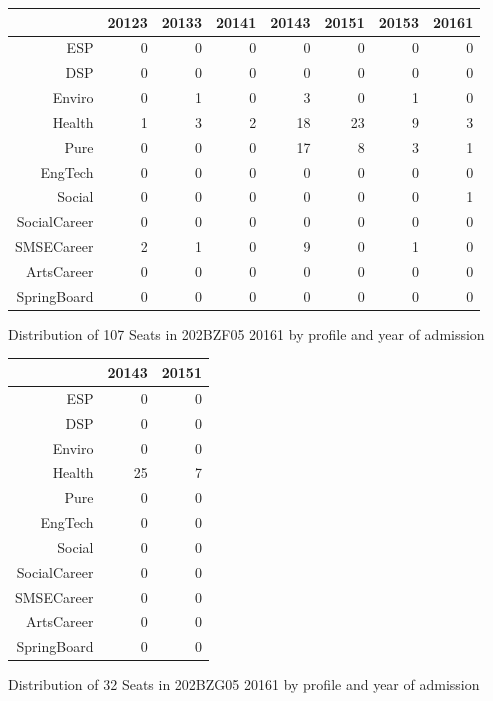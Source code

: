\documentclass{article}\usepackage[]{graphicx}\usepackage[]{color}
\begin{document}
\begin{figure}[H]
\centering
\begin{tabular}{rrrrrrrr}
  \hline
 & 20123 & 20133 & 20141 & 20143 & 20151 & 20153 & 20161 \\ 
  \hline
ESP &   0 &   0 &   0 &   0 &   0 &   0 &   0 \\ 
  DSP &   0 &   0 &   0 &   0 &   0 &   0 &   0 \\ 
  Enviro &   0 &   1 &   0 &   3 &   0 &   1 &   0 \\ 
  Health &   1 &   3 &   2 &  18 &  23 &   9 &   3 \\ 
  Pure &   0 &   0 &   0 &  17 &   8 &   3 &   1 \\ 
  EngTech &   0 &   0 &   0 &   0 &   0 &   0 &   0 \\ 
  Social &   0 &   0 &   0 &   0 &   0 &   0 &   1 \\ 
  SocialCareer &   0 &   0 &   0 &   0 &   0 &   0 &   0 \\ 
  SMSECareer &   2 &   1 &   0 &   9 &   0 &   1 &   0 \\ 
  ArtsCareer &   0 &   0 &   0 &   0 &   0 &   0 &   0 \\ 
  SpringBoard &   0 &   0 &   0 &   0 &   0 &   0 &   0 \\ 
   \hline
\end{tabular}
\caption{Distribution of 107 Seats in 202BZF05 20161 by profile and year of admission} 
\end{figure}
\begin{figure}[H]
\centering
\begin{tabular}{rrr}
  \hline
 & 20143 & 20151 \\ 
  \hline
ESP &   0 &   0 \\ 
  DSP &   0 &   0 \\ 
  Enviro &   0 &   0 \\ 
  Health &  25 &   7 \\ 
  Pure &   0 &   0 \\ 
  EngTech &   0 &   0 \\ 
  Social &   0 &   0 \\ 
  SocialCareer &   0 &   0 \\ 
  SMSECareer &   0 &   0 \\ 
  ArtsCareer &   0 &   0 \\ 
  SpringBoard &   0 &   0 \\ 
   \hline
\end{tabular}
\caption{Distribution of 32 Seats in 202BZG05 20161 by profile and year of admission} 
\end{figure}
\end{document}
